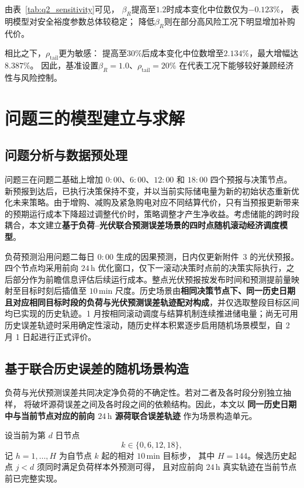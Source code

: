 \documentclass[zihao=-4,a4paper,UTF8,fontset=none]{ctexart}
\begin{document}
由表~\ref{tab:q2_sensitivity}可见，
$\beta_R$提高至$1.2$时成本变化中位数仅为$-0.123\%$，
表明模型对安全裕度参数总体较稳定；
降低$\beta_R$则在部分高风险工况下明显增加补购代价。

相比之下，$\rho_{\mathrm{tail}}$更为敏感：
提高至$30\%$后成本变化中位数增至$2.134\%$，最大增幅达$8.387\%$。
因此，基准设置$\beta_R=1.0$、$\rho_{\mathrm{tail}}=20\%$
在代表工况下能够较好兼顾经济性与风险控制。



\section{问题三的模型建立与求解}
\subsection{问题分析与数据预处理}

问题三在问题二基础上增加 $0{:}00$、$6{:}00$、$12{:}00$ 和 $18{:}00$ 四个预报与决策节点。新预报到达后，已执行决策保持不变，并以当前实际储电量为新的初始状态重新优化未来策略。由于增购、减购及紧急购电对应不同结算代价，只有当预报更新带来的预期运行成本下降超过调整代价时，策略调整才产生净收益。考虑储能的跨时段耦合，本文建立\textbf{基于负荷--光伏联合预测误差场景的四时点随机滚动经济调度模型}。

负荷预测沿用问题二每日 $0{:}00$ 生成的因果预测，日内仅更新附件~3 的光伏预报。四个节点均采用前向 $24\,\mathrm{h}$ 优化窗口，仅下一滚动决策时点前的决策实际执行，之后部分作为前瞻信息评估后续运行成本。整点光伏预报按发布时间和预测提前量映射至目标时刻后插值至 $10\,\mathrm{min}$ 尺度。历史场景由\textbf{相同决策节点下、同一历史日期且对应相同目标时段的负荷与光伏预测误差轨迹配对构成}，并仅选取整段目标区间均已实现的历史轨迹。1 月按相同滚动调度与结算机制连续推进储电量；尚无可用历史误差轨迹时采用确定性滚动，随历史样本积累逐步启用随机场景模型，自 2 月 1 日起进行正式评价。
\subsection{基于联合历史误差的随机场景构造}

负荷与光伏预测误差共同决定净负荷的不确定性。若对二者及各时段分别独立抽样，
将破坏源荷误差之间及各时段之间的依赖结构。因此，本文以
\textbf{同一历史日期中与当前节点对应的前向 $24\,\mathrm{h}$ 源荷联合误差轨迹}
作为场景构造单元。

设当前为第 $d$ 日节点
\[
k\in\{0,6,12,18\},
\]
记 $h=1,\ldots,H$ 为自节点 $k$ 起的相对 $10\,\mathrm{min}$ 目标步，
其中 $H=144$。候选历史起点 $j<d$ 须同时满足负荷样本外预测可得，
且对应前向 $24\,\mathrm{h}$ 真实轨迹在当前节点前已完整实现。
\end{document}
